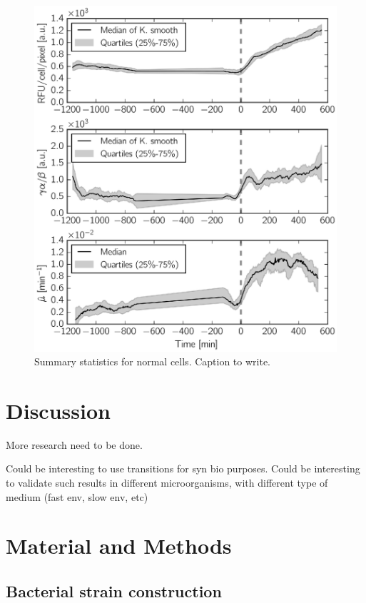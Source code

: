 \begin{figure}[h!]
\centering
\includegraphics[scale=1]{./Fig/gene_activity_median}
\caption{Summary statistics for normal cells. Caption to write.}
\label{fig:gene_activity_median}
\end{figure}


\section{Discussion}

More research need to be done.

Could be interesting to use transitions for syn bio purposes.
Could be interesting to validate such results in different microorganisms, with different type of medium (fast env, slow env, etc)

\section{Material and Methods}

\subsection{Bacterial strain construction}

